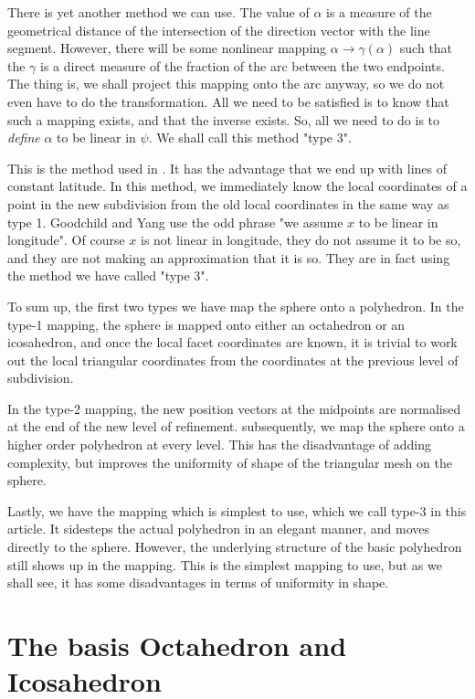 \documentclass[12pt]{article}
\begin{document}
There is yet another method we can use. The value of $\alpha$ is
a measure of the geometrical distance of the intersection of the
direction vector with the line segment. However, there will be some
nonlinear mapping $\alpha \rightarrow \gamma(\alpha)$ such that
the $\gamma$ is a direct measure of the fraction of the arc between
the two endpoints. The thing is, we shall project this mapping
onto the arc anyway, so we do not even have to do the transformation.
All we need to be satisfied is to know that such a mapping exists,
and that the inverse exists. So, all we need to do is to
{\it define} $\alpha$ to be linear in $\psi$. We shall call this
method "type 3". 

This is the method used in \cite{Goodchild:Mybib}. It has the
advantage that we end up with lines of constant latitude. In
this method, we immediately know the local coordinates of a point in the
new subdivision from the old local coordinates in the same way as type 1.
Goodchild and Yang use the odd phrase "we assume $x$ to be linear in longitude".
Of course $x$ is not linear in longitude, they do not assume it to be so,
and they are not making an approximation that it is so. They are
in fact using the method we have called "type 3". 

To sum up, the first two types we have map the sphere onto a polyhedron.
In the type-1 mapping, the sphere is mapped onto either an octahedron
or an icosahedron, and once the local facet coordinates are known, it is
trivial to work out the local triangular coordinates from the coordinates
at the previous level of subdivision.

In the type-2 mapping, the new position vectors at the midpoints are 
normalised at the end of the new level of refinement. subsequently, we
map the sphere onto a higher order polyhedron at every level. This
has the disadvantage of adding complexity, but improves the uniformity
of shape of the triangular mesh on the sphere.

Lastly, we have the  mapping which is simplest to use, which we call type-3
 in this article.
It sidesteps the actual polyhedron in an elegant manner, and moves directly to
the sphere. However, the underlying structure of the basic polyhedron still
shows up in the mapping. This is the simplest mapping to use, but as
we shall see, it has some disadvantages in terms of uniformity in shape.


\section{The basis Octahedron and Icosahedron}
\end{document}
